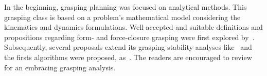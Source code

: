 

In the beginning, grasping planning was focused on analytical methods. This grasping class is based on a problem's mathematical model considering the kinematics and dynamics formulations. Well-accepted and suitable definitions and propositions regarding form- and force-closure grasping were first explored by~\cite{diziouglu1984mechanics,Nguyen1987_1,Nguyen1987_2}. Subsequently, several proposals extend its grasping stability analyses like~\cite{bicchi1995closure, ponce1995computing, li2003computing} and
the firsts algorithms were proposed, as~\cite{liu1999qualitative,liu2000computing,ding2000computing}. The readers are encouraged to review~\cite{murray1994mathematical,prattichizzo2016grasping} for an embracing grasping analysis.

